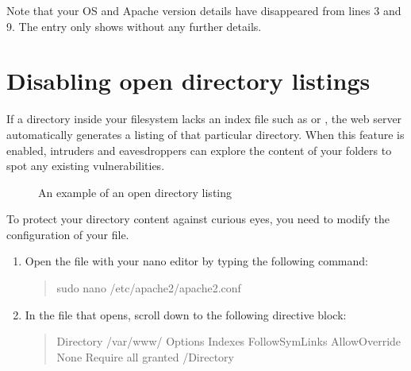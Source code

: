 \documentclass[a4paper,10pt,english,openany,oneside]{sphinxmanual}
\begin{document}
\begin{sloppypar}
\sphinxAtStartPar
Note that your OS and Apache version details have disappeared from lines 3 and 9. The  entry only shows  without any further details.


\section{Disabling open directory listings}
\label{\detokenize{hardening-apache:disabling-open-directory-listings}}
\sphinxAtStartPar
If a directory inside your filesystem lacks an index file such as  or , the web server automatically generates a listing of that particular directory. When this feature is enabled, intruders and eavesdroppers can explore the content of your folders to spot any existing vulnerabilities.

\begin{figure}[H]
\centering
\capstart

\noindent{}
\caption{An example of an open directory listing}\label{\detokenize{hardening-apache:id2}}\end{figure}

\sphinxAtStartPar
To protect your directory content against curious eyes, you need to modify the configuration of your  file.
\begin{enumerate}
%
\item {} 
\sphinxAtStartPar
Open the file with your nano editor by typing the following command:
\begin{quote}

\begin{sphinxVerbatim}[commandchars=\\\{\}]
\PYGZdl{} sudo nano /etc/apache2/apache2.conf
\end{sphinxVerbatim}
\end{quote}

\item {} 
\sphinxAtStartPar
In the file that opens, scroll down to the following directive block:
\begin{quote}

\begin{sphinxVerbatim}[commandchars=\\\{\}]
\PYGZlt{}Directory /var/www/\PYGZgt{}
        Options Indexes FollowSymLinks
        AllowOverride None
        Require all granted
\PYGZlt{}/Directory\PYGZgt{}
\end{sphinxVerbatim}
\end{quote}


\end{enumerate}
\end{sloppypar}
\end{document}
